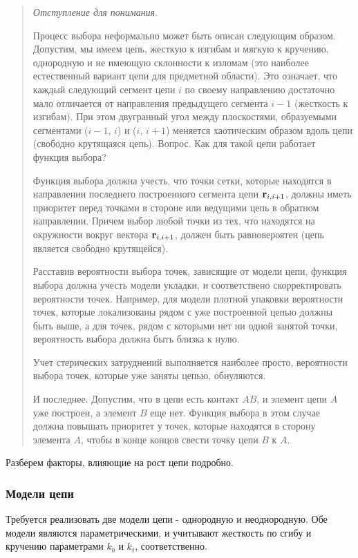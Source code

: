 \documentclass[tikz,a4paper]{scrartcl} %
\begin{document}
\begin{quote} \textit{Отступление для понимания}. 

Процесс выбора неформально может быть описан следующим образом. Допустим, мы имеем цепь, жесткую к изгибам и мягкую к кручению, однородную и не имеющую склонности к изломам (это наиболее естественный вариант цепи для предметной области). Это означает, что каждый следующий сегмент цепи $i$ по своему направлению достаточно мало отличается от направления предыдущего сегмента $i-1$ (жесткость к изгибам). При этом двугранный угол между плоскостями, образуемыми сегментами ($i-1$, $i$) и ($i$, $i+1$) меняется хаотическим образом вдоль цепи (свободно крутящаяся цепь). Вопрос. Как для такой цепи работает функция выбора?

Функция выбора должна учесть, что точки сетки, которые находятся в направлении последнего построенного сегмента цепи $\bold r_{i,i+1}$, должны иметь приоритет перед точками в стороне или ведущими цепь в обратном направлении. Причем выбор любой точки из тех, что находятся на окружности вокруг вектора $\bold r_{i,i+1}$, должен быть равновероятен (цепь является свободно крутящейся). 

Расставив вероятности выбора точек, зависящие от модели цепи, функция выбора должна учесть модели укладки, и соответствено скорректировать вероятности точек. Например, для модели плотной упаковки вероятности точек, которые локализованы рядом с уже построенной цепью должны быть выше, а для точек, рядом с которыми нет ни одной занятой точки, вероятность выбора должна быть близка к нулю.

Учет стерических затруднений выполняется наиболее просто, вероятности выбора точек, которые уже заняты цепью, обнуляются.

И последнее. Допустим, что в цепи есть контакт $AB$, и элемент цепи $A$ уже построен, а элемент $B$ еще нет. Функция выбора в этом случае должна повышать приоритет у точек, которые находятся в сторону элемента $A$, чтобы в конце концов свести точку цепи $B$ к $A$.

\end{quote}

Разберем факторы, влияющие на рост цепи подробно.
\subsubsection*{Модели цепи}
Требуется реализовать две модели цепи - однородную и неоднородную. Обе модели являются параметрическими, и учитывают жесткость по сгибу и кручению параметрами $k_b$ и $k_t$, соответственно. 
\end{document}
